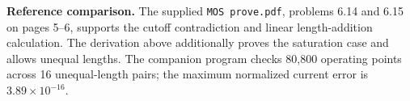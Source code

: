 \documentclass[11pt,a4paper]{article}
\newcommand{\NM}[4]{%
  \coordinate (#1t) at (#2,{#3+.5});\coordinate (#1b) at (#2,{#3-.5});
  \draw (#1t)--(#2,{#3+.28})--({#2+.12},{#3+.28})--({#2+.12},{#3-.28})--(#2,{#3-.28})--(#1b);
  \draw ({#2-.14},{#3-.2})--({#2-.14},{#3+.2});
  \draw ({#2-.55},#3)--({#2-.14},#3);
  \node[anchor=east] at ({#2-.62},#3) {$#4$};}
\newcommand{\groundat}[2]{\draw (#1,#2)--(#1,{#2-.13});
  \draw ({#1-.28},{#2-.13})--({#1+.28},{#2-.13});
  \draw ({#1-.18},{#2-.22})--({#1+.18},{#2-.22});
  \draw ({#1-.08},{#2-.31})--({#1+.08},{#2-.31});}
\begin{document}
\begin{center}\end{center}
\textbf{Reference comparison.} The supplied \texttt{MOS prove.pdf}, problems
6.14 and 6.15 on pages 5--6, supports the cutoff contradiction and linear
length-addition calculation. The derivation above additionally proves the
saturation case and allows unequal lengths. The companion program checks
80,800 operating points across 16 unequal-length pairs; the maximum normalized
current error is $3.89\times10^{-16}$.
\end{document}
